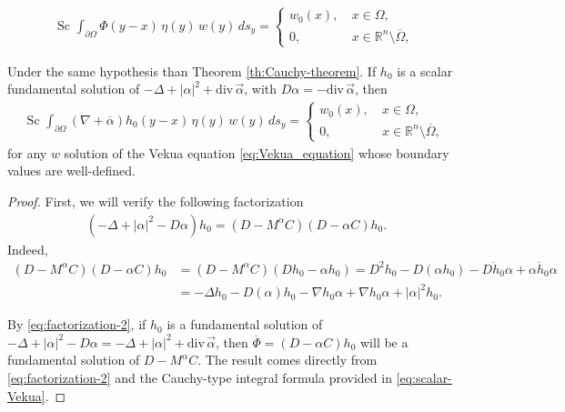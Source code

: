 \documentclass[10pt,a4paper]{amsart}
\def\R{\mathbb{R}}
\def\div{\mbox{div}\,}
\begin{document}
\begin{align}\label{eq:scalar-Vekua}
  \text{Sc }\int_{\partial\Omega} \Phi(y-x)\, \eta(y) \, w(y) \,ds_{y}=\left\{
   \begin{array}{ll}
      w_0(x), \ & x\in \Omega,\\
      0,           & x\in \R^n\setminus \overline{\Omega},
   \end{array}
\right.
\end{align}

\begin{corollary}\label{cor:Cauchy-fundamental}
Under the same hypothesis than Theorem \ref{th:Cauchy-theorem}. If $h_0$ is a scalar fundamental solution of $-\Delta+|\alpha|^2+\div \vec \alpha$, with $D\alpha=-\div \vec \alpha$, then
\begin{align*}
  \text{Sc }\int_{\partial\Omega} (\nabla+\overline{\alpha})h_0(y-x)\, \eta(y) \, w(y) \,ds_{y}=\left\{
   \begin{array}{ll}
      w_0(x), \ & x\in \Omega,\\
      0,           & x\in \R^n\setminus \overline{\Omega},
   \end{array}
\right.
\end{align*}
for any $w$ solution of the Vekua equation \eqref{eq:Vekua_equation} whose boundary values are well-defined.
\end{corollary}

\begin{proof}
First, we will verify the following factorization
\begin{align}\label{eq:factorization-2}
    \left(-\Delta+|\alpha|^2-D\alpha\right)h_0=(D-M^{\alpha}C)(D-\alpha C)h_0.
\end{align}
Indeed,
\begin{align*}
(D-M^{\alpha}C)(D-\alpha C)h_0&=(D-M^{\alpha}C)(Dh_0-\alpha h_0)=D^2 h_0-D(\alpha h_0)-\overline{Dh_0}\alpha+\overline{\alpha h_0}\alpha\\
&=-\Delta h_0-D(\alpha) h_0- \nabla h_0\alpha+\nabla h_0\alpha+|\alpha|^2h_0.
\end{align*}

By \eqref{eq:factorization-2}, if $h_0$ is a fundamental solution of $-\Delta+|\alpha|^2-D \alpha=-\Delta+|\alpha|^2+\div \vec \alpha$, then $\overline{\Phi}=(D-\alpha C)h_0$ will be a fundamental solution of $D-M^{\alpha}C$.
The result comes directly from \eqref{eq:factorization-2} and the Cauchy-type integral formula provided in \eqref{eq:scalar-Vekua}.
\end{proof}
\end{document}
